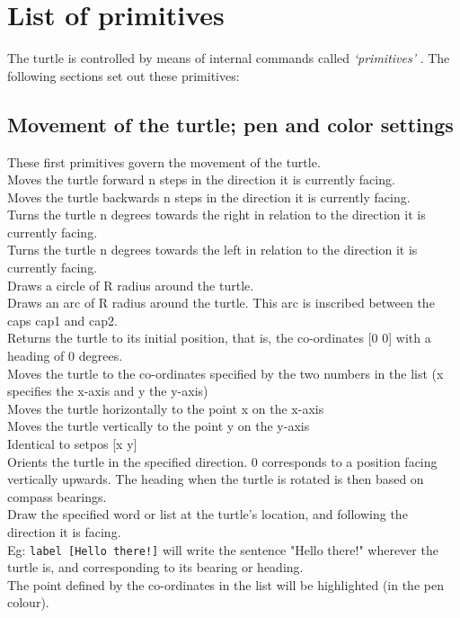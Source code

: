 \chapter{List of primitives }
\label{liste-prim} The turtle is controlled by means of internal commands
called \emph{`primitives'} . The following sections set out these
primitives:
\section{Movement of the turtle; pen and color settings}
These first primitives govern the movement of the turtle.\\
 Moves the turtle forward n steps in the direction it is currently facing.\\
 Moves the turtle backwards n steps in the direction it is currently facing.\\
 Turns the turtle n degrees towards the right in relation to the direction it is currently facing.\\
 Turns the turtle n degrees towards the left in relation to the direction it is currently facing.\\
 Draws a circle of R radius around the turtle.\\
Draws an arc of R radius around the turtle. This arc is inscribed between the caps cap1 and cap2.\\
 Returns the turtle to its initial position, that is, the co-ordinates {[}0 0{]} with a heading of 0 degrees.\\
 Moves the turtle to the co-ordinates specified by the two numbers in the list (x specifies the x-axis and y the y-axis)\\
 Moves the turtle horizontally to the point x on the x-axis\\
 Moves the turtle vertically to the point y on the y-axis\\
 Identical to setpos {[}x y{]}\\
 Orients the turtle in the specified direction. 0 corresponds to a position facing vertically upwards.  The heading when the turtle is rotated is then based on compass bearings. \\
Draw the specified word or list at the turtle's location, and following the direction it is facing.\\
 Eg: \texttt{label [Hello there!]} will write the sentence "Hello there!" wherever the turtle is, and corresponding to its bearing or heading.\\
The point defined by the co-ordinates in the list will be highlighted (in the pen colour).\\ \\


